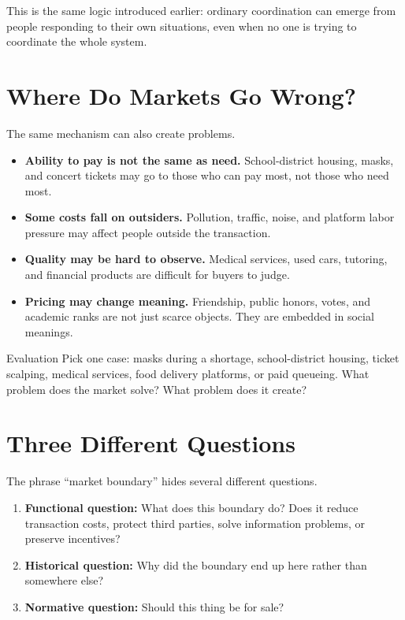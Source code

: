 \documentclass[10pt,a4paper]{article}
\begin{document}
This is the same logic introduced earlier: ordinary coordination can emerge from people responding to their own situations, even when no one is trying to coordinate the whole system.

\section{Where Do Markets Go Wrong?}

The same mechanism can also create problems.

\begin{itemize}
  \item \textbf{Ability to pay is not the same as need.} School-district housing, masks, and concert tickets may go to those who can pay most, not those who need most.
  \item \textbf{Some costs fall on outsiders.} Pollution, traffic, noise, and platform labor pressure may affect people outside the transaction.
  \item \textbf{Quality may be hard to observe.} Medical services, used cars, tutoring, and financial products are difficult for buyers to judge.
  \item \textbf{Pricing may change meaning.} Friendship, public honors, votes, and academic ranks are not just scarce objects. They are embedded in social meanings.
\end{itemize}

\begin{discussionbox}{Evaluation}
Pick one case: masks during a shortage, school-district housing, ticket scalping, medical services, food delivery platforms, or paid queueing. What problem does the market solve? What problem does it create?
\end{discussionbox}

\section{Three Different Questions}

The phrase ``market boundary'' hides several different questions.

\begin{enumerate}
  \item \textbf{Functional question:} What does this boundary do? Does it reduce transaction costs, protect third parties, solve information problems, or preserve incentives?
  \item \textbf{Historical question:} Why did the boundary end up here rather than somewhere else?
  \item \textbf{Normative question:} Should this thing be for sale?
\end{enumerate}
\end{document}
